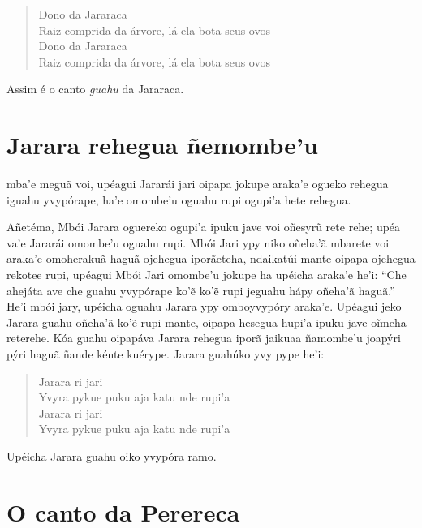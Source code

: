 \begin{verse}
Dono da Jararaca\\
Raiz comprida da árvore,\footnotemark{} lá ela bota seus ovos\\
Dono da Jararaca\\
Raiz comprida da árvore, lá ela bota seus ovos
\end{verse}

Assim é o canto \textit{guahu} da Jararaca.


\chapter{Jarara rehegua ñemombe'u}

 mba'e meguã voi, upéagui Jararái jari oipapa jokupe araka'e ogueko
rehegua iguahu yvypórape, ha'e omombe'u oguahu rupi ogupi'a hete
rehegua.


Añetéma, Mbói Jarara oguereko ogupi'a ipuku jave voi oñesyrũ rete rehe;
upéa va'e Jararái omombe'u oguahu rupi. Mbói Jari ypy niko oñeha'ã
mbarete voi araka'e omoherakuã haguã ojehegua iporãeteha, ndaikatúi
mante oipapa ojehegua rekotee rupi, upéagui Mbói Jari omombe'u jokupe ha
upéicha araka'e he'i: ``Che ahejáta ave che guahu yvypórape ko'ẽ ko'ẽ
rupi jeguahu hápy oñeha'ã haguã.'' He'i mbói jary, upéicha oguahu Jarara
ypy omboyvypóry araka'e. Upéagui jeko Jarara guahu oñeha'ã ko'ẽ rupi
mante, oipapa hesegua hupi'a ipuku jave oĩmeha reterehe. Kóa guahu
oipapáva Jarara rehegua iporã jaikuaa ñamombe'u joapýri pýri haguã ñande
kénte kuérype. Jarara guahúko yvy pype he'i:

\begin{verse}
Jarara ri jari\\
Yvyra pykue puku aja katu nde rupi'a\\
Jarara ri jari\\
Yvyra pykue puku aja katu nde rupi'a
\end{verse}


Upéicha Jarara guahu oiko yvypóra ramo.


\chapter{O canto da Perereca}

